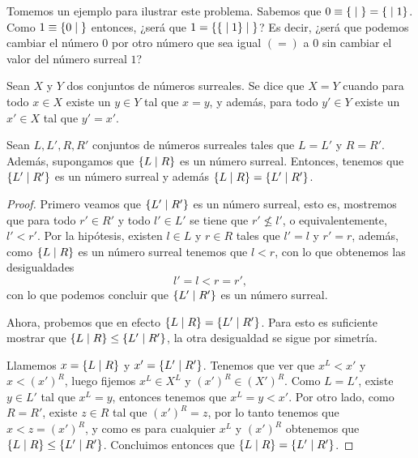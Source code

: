     Tomemos un ejemplo para ilustrar este problema. Sabemos que $0\equiv \left\{\;\middle|\; \right\} = \left\{\;\middle|\; 1\right\}$. Como $1\equiv \left\{0\;\middle|\; \right\}$ entonces, ¿ser\'a que $1 = \left\{\left\{\;\middle|\; 1\right\}\;\middle|\; \right\}$? Es decir, ¿ser\'a que podemos cambiar el n\'umero $0$ por otro n\'umero que sea igual $(=)$ a $0$ sin cambiar el valor del n\'umero surreal $1$?

    \begin{definition}
        Sean $X$ y $Y$ dos conjuntos de n\'umeros surreales. Se dice que $X=Y$ cuando para todo $x\in X$ existe un $y\in Y$ tal que $x=y$, y adem\'as, para todo $y'\in Y$ existe un $x'\in X$ tal que $y'=x'$.
    \end{definition}

    \begin{theorem}
        Sean $L,L',R, R'$ conjuntos de n\'umeros surreales tales que $L = L'$ y $R = R'$. Adem\'as, supongamos que $\left\{L\;\middle|\; R\right\}$ es un n\'umero surreal. Entonces, tenemos que $\left\{L'\;\middle|\; R'\right\}$ es un n\'umero surreal y adem\'as $\left\{L\;\middle|\; R\right\} = \left\{L'\;\middle|\; R'\right\}$.
    \end{theorem}

    \begin{proof}
        Primero veamos que $\left\{L'\;\middle|\; R'\right\}$ es un n\'umero surreal, esto es, mostremos que para todo $r'\in R'$ y todo $l'\in L'$ se tiene que $r' \not\le l'$, o equivalentemente, $l' < r'$. Por la hip\'otesis, existen $l\in L$ y $r\in R$ tales que $l' = l$ y $r' = r$, adem\'as, como $\left\{L\;\middle|\; R\right\}$ es un n\'umero surreal tenemos que $l < r$, con lo que obtenemos las desigualdades
        \[
            l' = l < r = r',
        \]
        con lo que podemos concluir que $\left\{L'\;\middle|\; R'\right\}$ es un n\'umero surreal.

        Ahora, probemos que en efecto $\left\{L\;\middle|\; R\right\} = \left\{L'\;\middle|\; R'\right\}$. Para esto es suficiente mostrar que $\left\{L\;\middle|\; R\right\} \le \left\{L'\;\middle|\; R'\right\}$, la otra desigualdad se sigue por simetr\'ia.

        Llamemos $x = \left\{L\;\middle|\; R\right\}$ y $x' = \left\{L'\;\middle|\; R'\right\}$. Tenemos que ver que $x^L < x'$ y $x < (x')^R$, luego fijemos $x^L\in X^L$ y $(x')^R\in (X')^R$. Como $L = L'$, existe $y\in L'$ tal que $x^L = y$, entonces tenemos que $x^L = y < x'$. Por otro lado, como $R = R'$, existe $z\in R$ tal que $(x')^R = z$, por lo tanto tenemos que $x < z = (x')^R$, y como es para cualquier $x^L$ y $(x')^R$ obtenemos que $\left\{L\;\middle|\; R\right\} \le \left\{L'\;\middle|\; R'\right\}$. Concluimos entonces que $\left\{L\;\middle|\; R\right\} = \left\{L'\;\middle|\; R'\right\}$.
    \end{proof}